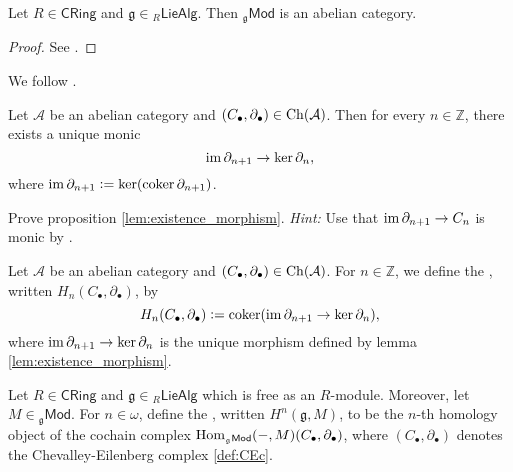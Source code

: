 \begin{proposition}
	Let $R \in \mathsf{CRing}$ and $\mathfrak{g} \in {_{R}\mathsf{LieAlg}}$. Then $_{\mathfrak{g}}\mathsf{Mod}$ is an abelian category.
\end{proposition}

\begin{proof}
	See \cite[220]{weibel:homological_algebra:1994}.
\end{proof}

We follow \cite[178]{kashiwara:categories:2006}.

\begin{proposition}
	\label{lem:existence_morphism}
	Let $\mathcal{A}$ be an abelian category and $(C_\bullet,\partial_\bullet) \in \operatorname{Ch}(\mathcal{A})$. Then for every $n \in \mathbb{Z}$, there exists a unique monic 
	\begin{equation*}
		\operatorname{im} \partial_{n + 1} \to \ker \partial_n,
	\end{equation*}
	\noindent where $\operatorname{im} \partial_{n + 1} := \ker(\operatorname{coker} \partial_{n + 1})$.
\end{proposition}

\begin{exercise}
	Prove proposition \ref{lem:existence_morphism}. \emph{Hint:} Use that $\operatorname{im} \partial_{n + 1} \to C_n$ is monic by \cite[199]{maclane:categories:1978}.
\end{exercise}

\begin{definition}[Homology]
	Let $\mathcal{A}$ be an abelian category and $(C_\bullet,\partial_\bullet) \in \operatorname{Ch}(\mathcal{A})$. For $n \in \mathbb{Z}$, we define the , written $H_n(C_\bullet,\partial_\bullet)$, by
	\begin{equation*}
		H_n(C_\bullet,\partial_\bullet) := \operatorname{coker}(\operatorname{im} \partial_{n + 1} \to \ker \partial_n),
	\end{equation*}
	\noindent where $\operatorname{im} \partial_{n + 1} \to \ker \partial_n$ is the unique morphism defined by lemma \ref{lem:existence_morphism}.
\end{definition}

\begin{definition}
	Let $R \in \mathsf{CRing}$ and $\mathfrak{g} \in {_{R}}\mathsf{LieAlg}$ which is free as an $R$-module. Moreover, let $M \in {_{\mathfrak{g}}}\mathsf{Mod}$. For $n \in \omega$, define the , written $H^n(\mathfrak{g},M)$, to be the $n$-th homology object of the cochain complex $\operatorname{Hom}_{_{\mathfrak{g}}\mathsf{Mod}}(-,M)(C_\bullet,\partial_\bullet)$, where $(C_\bullet,\partial_\bullet)$ denotes the Chevalley-Eilenberg complex \ref{def:CEc}.
\end{definition}

